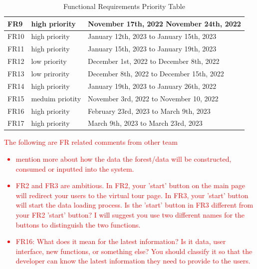\documentclass{article}
\begin{document}
\begin{table}[H]
\begin{tabular}{|lll|}
\multicolumn{1}{|l|}{FR9}                                                               & \multicolumn{1}{l|}{high priority}   & November 17th, 2022 November 24th, 2022    \\ \hline
\multicolumn{1}{|l|}{FR10}                                                              & \multicolumn{1}{l|}{high priority}   & January 12th, 2023 to January 15th, 2023   \\ \hline
\multicolumn{1}{|l|}{FR11}                                                              & \multicolumn{1}{l|}{high priority}   & January 15th, 2023 to January 19th, 2023   \\ \hline
\multicolumn{1}{|l|}{FR12}                                                              & \multicolumn{1}{l|}{low priority}    & December 1st, 2022 to December 8th, 2022   \\ \hline
\multicolumn{1}{|l|}{FR13}                                                              & \multicolumn{1}{l|}{low prirority}   & December 8th, 2022 to December 15th, 2022  \\ \hline
\multicolumn{1}{|l|}{FR14}                                                              & \multicolumn{1}{l|}{high priority}   & January 19th, 2023 to January 26th, 2022   \\ \hline
\multicolumn{1}{|l|}{FR15}                                                              & \multicolumn{1}{l|}{meduim priotity} & November 3rd, 2022 to November 10, 2022    \\ \hline
\multicolumn{1}{|l|}{FR16}                                                              & \multicolumn{1}{l|}{high priority}   & February 23rd, 2023 to March 9th, 2023     \\ \hline
\multicolumn{1}{|l|}{FR17}                                                              & \multicolumn{1}{l|}{high priority}   & March 9th, 2023 to March 23rd, 2023        \\ \hline
\end{tabular}
\caption{Functional Requirements Priority Table}
\end{table}

\textcolor{red}{
The following are FR related comments from other team
\begin{itemize}
\item mention more about how the data the forest/data will be constructed, consumed or inputted
into the system.
\item FR2 and FR3 are ambitious. In FR2, your 'start' button on the main page will redirect your users to the virtual tour page. In FR3, your 'start' button will start the data loading process. Is the 'start' button in FR3 different from your FR2 'start' button? I will suggest you use two different names for the buttons to distinguish the two functions.
\item FR16:
What does it mean for the latest information? Is it data, user interface, new functions, or something else? You should classify it so that the developer can know the latest information they need to provide to the users.
\end{itemize} 
}
\end{document}
